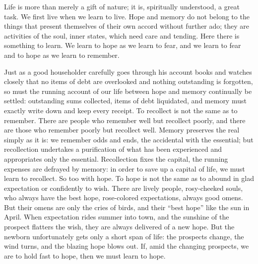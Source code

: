 \documentclass[12pt,a4paper,openany]{book}
\newcommand{\opage}[1]{\marginnote{\footnotesize\textit{[#1]}}}
\begin{document}
Life is more than merely a gift of nature; it is, spiritually understood, a great task. We first
live when we learn to live. Hope and memory do not belong to the things that present themselves of
their own accord without further ado; they are activities of the soul, inner states, which need care
and tending. Here there is something to learn. We learn to hope as we learn to fear, and we learn to
fear and to hope as we learn to remember.

Just as a good householder carefully goes through his account books and watches closely that no
items of debt are overlooked and nothing outstanding is forgotten, so must the running account of
our life between hope and memory continually be settled: outstanding sums collected, items of debt
liquidated, and memory must exactly write down and keep every receipt. To recollect is not the same
as to remember. There are people who remember well but recollect poorly, and there are those who
remember poorly but recollect well. Memory preserves the real simply as it is: we remember odds and
ends, the accidental with the essential; but recollection undertakes a purification of what has been
experienced and appropriates only the essential. Recollection fixes the capital, the running
expenses are defrayed by memory: in order to save up a capital of life, we must learn to recollect.
So too with hope. To hope is not the same as to
\setcounter{footnote}{0}%
\opage{5}abound in glad expectation or confidently to wish. There are lively people, rosy-cheeked
souls, who always have the best hope, rose-colored expectations, always good omens. But their omens
are only the cries of birds, and their ``best hope'' like the sun in April. When expectation rides
summer into town, and the sunshine of the prospect flatters the wish, they are always delivered of a
new hope. But the newborn unfortunately gets only a short span of life: the prospects change, the
wind turns, and the blazing hope blows out. If, amid the changing prospects, we are to hold fast to
hope, then we must learn to hope.
\end{document}
